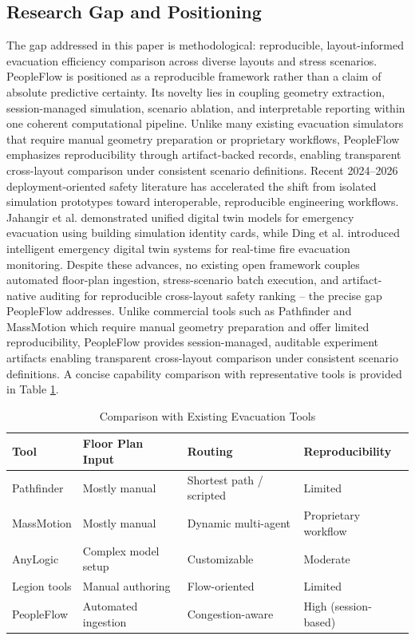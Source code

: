 \documentclass[nolineno]{ieeeaccess}
\begin{document}
\subsection{Research Gap and Positioning}
The gap addressed in this paper is methodological: reproducible, layout-informed evacuation efficiency comparison across diverse layouts and stress scenarios. PeopleFlow is positioned as a reproducible framework rather than a claim of absolute predictive certainty. Its novelty lies in coupling geometry extraction, session-managed simulation, scenario ablation, and interpretable reporting within one coherent computational pipeline.
Unlike many existing evacuation simulators that require manual geometry preparation or proprietary workflows, PeopleFlow emphasizes reproducibility through artifact-backed records, enabling transparent cross-layout comparison under consistent scenario definitions.
Recent 2024--2026 deployment-oriented safety literature has accelerated the shift from isolated simulation prototypes toward interoperable, reproducible engineering workflows. Jahangir et al. \cite{jahangir2025dt} demonstrated unified digital twin models for emergency evacuation using building simulation identity cards, while Ding et al. \cite{ding2023jbe} introduced intelligent emergency digital twin systems for real-time fire evacuation monitoring. Despite these advances, no existing open framework couples automated floor-plan ingestion, stress-scenario batch execution, and artifact-native auditing for reproducible cross-layout safety ranking -- the precise gap PeopleFlow addresses. Unlike commercial tools such as Pathfinder and MassMotion which require manual geometry preparation and offer limited reproducibility, PeopleFlow provides session-managed, auditable experiment artifacts enabling transparent cross-layout comparison under consistent scenario definitions.
A concise capability comparison with representative tools is provided in Table \ref{tab:tool_comparison}.

\begin{table}[t]
\centering
\caption{Comparison with Existing Evacuation Tools}
\label{tab:tool_comparison}
{\scriptsize
\setlength{\tabcolsep}{3pt}
\begin{tabular}{>{\raggedright\arraybackslash}p{1.60cm} >{\raggedright\arraybackslash}p{1.20cm} >{\raggedright\arraybackslash}p{1.95cm} >{\raggedright\arraybackslash}p{2.00cm}}
\toprule
Tool & Floor Plan Input & Routing & Reproducibility \\
\midrule
Pathfinder & Mostly manual & Shortest path / scripted & Limited \\
MassMotion & Mostly manual & Dynamic multi-agent & Proprietary workflow \\
AnyLogic & Complex model setup & Customizable & Moderate \\
Legion tools & Manual authoring & Flow-oriented & Limited \\
PeopleFlow & Automated ingestion & Congestion-aware & High (session-based) \\
\bottomrule
\end{tabular}
}
\end{table}
\end{document}
